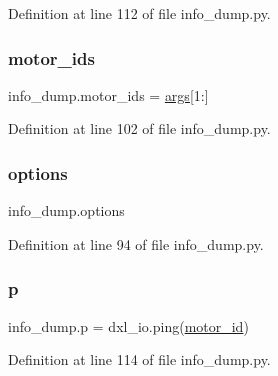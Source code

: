 Definition at line 112 of file info\+\_\+dump.\+py.

\mbox{\label{namespaceinfo__dump_ace0a37572cece800e11d67ce29077e98}} 
\subsubsection{\texorpdfstring{motor\+\_\+ids}{motor\_ids}}
{\footnotesize\ttfamily info\+\_\+dump.\+motor\+\_\+ids = \hyperlink{namespaceinfo__dump_a027c02ad18aa7a853a517433230af8a1}{args}\mbox{[}1\+:\mbox{]}}



Definition at line 102 of file info\+\_\+dump.\+py.

\mbox{\label{namespaceinfo__dump_a7d6b1021261929bba75323767de00e7c}} 
\subsubsection{\texorpdfstring{options}{options}}
{\footnotesize\ttfamily info\+\_\+dump.\+options}



Definition at line 94 of file info\+\_\+dump.\+py.

\mbox{\label{namespaceinfo__dump_a4121bc21863b0d4380aac92a52617fd0}} 
\subsubsection{\texorpdfstring{p}{p}}
{\footnotesize\ttfamily info\+\_\+dump.\+p = dxl\+\_\+io.\+ping(\hyperlink{namespaceinfo__dump_ab8304b7617ad78e51a49ee40b5f2f3fc}{motor\+\_\+id})}



Definition at line 114 of file info\+\_\+dump.\+py.

\mbox{\label{namespaceinfo__dump_a4b2573b90a51048b077f2b1909886483}} 
